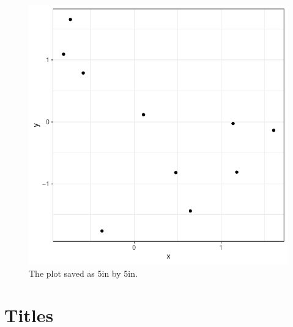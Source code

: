 \documentclass[11pt,letterpaper,english,oneside]{article}\usepackage[]{graphicx}\usepackage[]{xcolor}
\begin{document}
\begin{figure}[h!]
\centering
\includegraphics{figures-and-tables/test_plot_large.pdf}
\caption{The plot saved as 5in by 5in.}
\label{fig:test-plot-large}
\end{figure}


\section{Titles}
\end{document}
